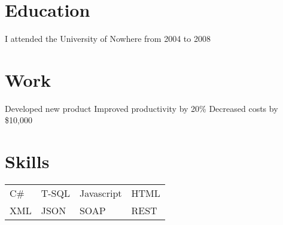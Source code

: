 \documentclass{my_class}
\begin{document}


\section{Education}
I attended the University of Nowhere from 2004 to 2008

\section{Work}
\workitems
{Developed new product}
{Improved productivity by 20\%}
{Decreased costs by \$10,000}

\section{Skills}
\begin{tabular}{l l l l}
C\# & T-SQL & Javascript & HTML \\
XML & JSON & SOAP & REST
\end{tabular}
\end{document}
